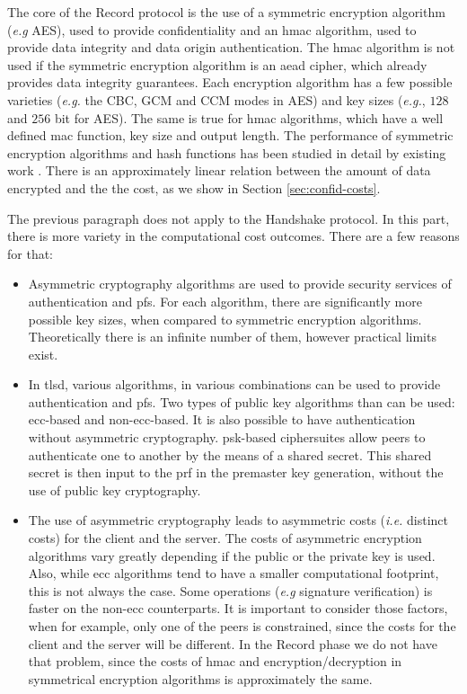 \documentclass{llncs}
\begin{document}
The core of the Record protocol is the use of a symmetric encryption algorithm (\textit{e.g} AES), used to
provide confidentiality and an \gls{hmac} algorithm, used to provide data integrity and data origin authentication.
The \gls{hmac} algorithm is not used if the symmetric encryption algorithm is an \gls{aead} cipher, which already
provides data integrity guarantees. Each encryption algorithm has a few possible varieties (\textit{e.g.} the CBC, GCM and CCM modes in AES)
and key sizes  (\textit{e.g.}, $128$ and $256$ bit for AES). The same is true for \gls{hmac} algorithms, which
have a well defined \gls{mac} function, key size and output length. The performance of symmetric encryption
algorithms and hash functions has been studied in detail by existing work \cite{nadeem2005performance} \cite{mathew2010performance}.
There is an approximately linear relation between the amount of data encrypted and the the cost, as we 
show in Section \ref{sec:confid-costs}.

The previous paragraph does not apply to the Handshake protocol. In this part, there is more variety in the
computational cost outcomes. There are a few reasons for that:

\begin{itemize}

  \item Asymmetric cryptography algorithms are used to provide security services of authentication
  and \gls{pfs}. For each algorithm, there are significantly more possible key sizes, when compared to
  symmetric encryption algorithms. Theoretically there is an infinite number of them, however practical limits exist\cite{lenstra2004key}.

  \item In \gls{tlsd}, various algorithms, in various combinations can be used to provide authentication and \gls{pfs}.
  Two types of public key algorithms than can be used: \gls{ecc}-based and non-\gls{ecc}-based. It is also possible
  to have authentication without asymmetric cryptography. \gls{psk}-based ciphersuites allow peers to
  authenticate one to another by the means of a shared secret. This shared secret is then input to the \gls{prf}
  in the premaster key generation, without the use of public key cryptography.

  \item The use of asymmetric cryptography leads to asymmetric costs (\textit{i.e.} distinct costs) for the client and the server. The costs of asymmetric
  encryption algorithms vary greatly depending if the public or the private key is used. Also, while \gls{ecc}
  algorithms tend to have a smaller computational footprint, this is not always the case.
  Some operations (\textit{e.g} signature verification) is faster on the non-\gls{ecc} counterparts.
  It is important to consider those factors, when for example, only one of the peers is constrained, since the costs for the client and the server will be different.
  In the Record phase we do not have that problem, since the costs of \gls{hmac} and encryption/decryption in
  symmetrical encryption algorithms is approximately the same.

\end{itemize}
\end{document}
